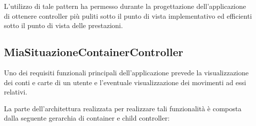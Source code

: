 L'utilizzo di tale pattern ha permesso durante la progettazione dell'applicazione di ottenere controller più puliti sotto il punto di vista implementativo ed efficienti sotto il punto di vista delle prestazioni.

\subsection{MiaSituazioneContainerController}
\label{parag:miasituaz}
Uno dei requisiti funzionali principali dell'applicazione prevede la visualizzazione dei conti e carte di un utente e l'eventuale visualizzazione dei movimenti ad essi relativi.

La parte dell'architettura realizzata per realizzare tali funzionalità è composta dalla seguente gerarchia di container e child controller:

